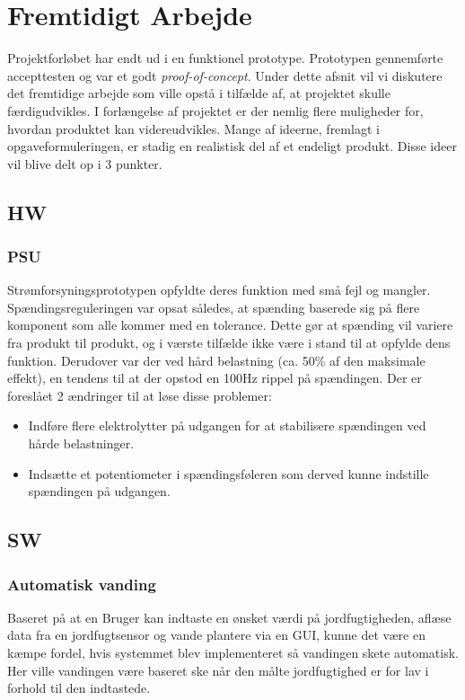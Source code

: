\section{Fremtidigt Arbejde}
Projektforløbet har endt ud i en funktionel prototype. Prototypen gennemførte accepttesten og var et godt \emph{proof-of-concept}. Under dette afsnit vil vi diskutere det fremtidige arbejde som ville opstå i tilfælde af, at projektet skulle færdigudvikles. I forlængelse af projektet er der nemlig flere muligheder for, hvordan produktet kan videreudvikles. Mange af ideerne, fremlagt i opgaveformuleringen, er stadig en realistisk del af et endeligt produkt. Disse ideer vil blive delt op i 3 punkter.

\subsection{HW}

\subsubsection{PSU}
Strømforsyningsprototypen opfyldte deres funktion med små fejl og mangler. Spændingsreguleringen var opsat således, at spænding baserede sig på flere komponent som alle kommer med en tolerance. Dette gør at spænding vil variere fra produkt til produkt, og i værste tilfælde ikke være i stand til at opfylde dens funktion. Derudover var der ved hård belastning (ca. 50\% af den maksimale effekt), en tendens til at der opstod en 100Hz rippel på spændingen. Der er foreslået 2 ændringer til at løse disse problemer:

\begin{itemize}
\item Indføre flere elektrolytter på udgangen for at stabilisere spændingen ved hårde belastninger.
\item Indsætte et potentiometer i spændingsføleren som derved kunne indstille spændingen på udgangen.
\end{itemize}


\subsection{SW} 
\subsubsection{Automatisk vanding}
Baseret på at en Bruger kan indtaste en ønsket værdi på jordfugtigheden, aflæse data fra en jordfugtsensor og vande plantere via en GUI, kunne det være en kæmpe fordel, hvis systemmet blev implementeret så vandingen skete automatisk. Her ville vandingen være baseret ske når den målte jordfugtighed er for lav i forhold til den indtastede. 

